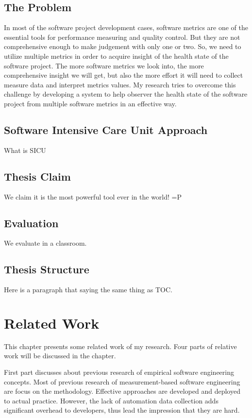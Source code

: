 \section{The Problem}
In most of the software project development cases, software metrics are one of the essential tools for performance measuring and quality control. But they are not comprehensive enough to make judgement with only one or two. So, we need to utilize multiple metrics in order to acquire insight of the health state of the software project. The more software metrics we look into, the more comprehensive insight we will get, but also the more effort it will need to collect measure data and interpret metrics values. My research tries to overcome this challenge by developing a system to help observer the health state of the software project from multiple software metrics in an effective way.

\section{Software Intensive Care Unit Approach}
What is SICU

\section{Thesis Claim}
We claim it is the most powerful tool ever in the world! =P

\section{Evaluation}
We evaluate in a classroom.

\section{Thesis Structure}
Here is a paragraph that saying the same thing as TOC.

\chapter{Related Work}
This chapter presents some related work of my research. Four parts of relative work will be discussed in the chapter.

First part discusses about previous research of empirical software engineering concepts. Most of previous research of measurement-based software engineering are focus on the methodology. Effective approaches are developed and deployed to actual practice. However, the lack of automation data collection adds significant overhead to developers, thus lead the impression that they are hard. 

